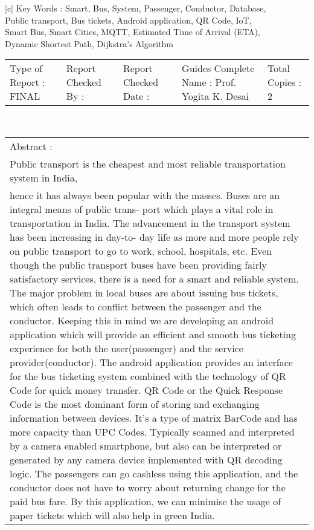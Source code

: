\begin{table}
\begin{center}
\begin{tabular}{|c|}
Key Words : Smart, Bus, System, Passenger, Conductor, Database, \\ Public transport, Bus tickets, Android application, QR Code, IoT, \\ Smart Bus, Smart Cities, MQTT, Estimated Time of Arrival (ETA), \\ Dynamic Shortest Path, Dijkstra’s Algorithm \\ 		\hline
\begin{tabular}{|p{3.3cm}|p{3cm}|p{3cm}|p{3cm}|p{3cm}|}
 Type of Report : FINAL & Report Checked By :    & Report Checked Date : & Guides Complete Name : 
Prof. Yogita K. Desai & Total Copies  : 2
\\\end{tabular} \\ \hline
\begin{tabular}{|p{15cm}|}
 Abstract : \\
Public transport is the cheapest and most reliable transportation system in India,\\ hence it has always been popular with the masses. Buses are an integral means of public trans- port which plays a vital role in transportation in India. The advancement in the transport system has been increasing in day-to- day life as more and more people rely on public transport to go to work, school, hospitals, etc. Even though the public transport buses have been providing fairly satisfactory services, there is a need for a smart and reliable system. The major problem in local buses are about issuing bus tickets, which often leads to conflict between the passenger and the conductor. Keeping this in mind we are developing an android application which will provide an efficient and smooth bus ticketing experience for both the user(passenger) and the service provider(conductor). The android application provides an interface for the bus ticketing system combined with the technology of QR Code for quick money transfer. QR Code or the Quick Response Code is the most dominant form of storing and exchanging information between devices. It’s a type of matrix BarCode and has more capacity than UPC Codes. Typically scanned and interpreted by a camera enabled smartphone, but also can be interpreted or generated by any camera device implemented with QR decoding logic. The passengers can go cashless using this application, and the conductor does not have to worry about returning change for the paid bus fare. By this application, we can minimise the usage of paper tickets which will also help in green India. 
\\\end{tabular} \\ \hline
  \end{tabular}
   \end{center}
\end{table}



